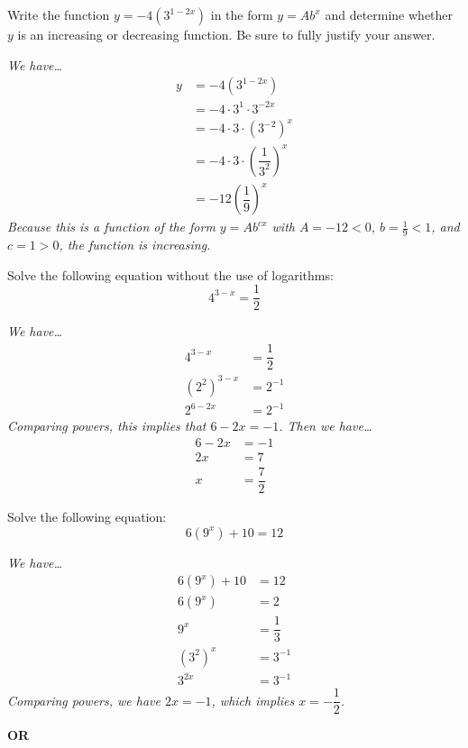 \documentclass[12pt,letterpaper]{exam}
\begin{document}
\begin{questions}
\newpage
\question[6] Write the function $y= -4(3^{1 - 2x})$ in the form $y= Ab^x$ and determine whether $y$ is an increasing or decreasing function. Be sure to fully justify your answer. \pspace

{\itshape We have\dots
	\[
	\begin{aligned}
	y&= -4(3^{1 - 2x}) \\[0.3cm]
	&= -4 \cdot 3^1 \cdot 3^{-2x} \\[0.3cm]
	&= -4 \cdot 3 \cdot (3^{-2})^x \\[0.3cm]
	&= -4 \cdot 3 \cdot \left( \dfrac{1}{3^2} \right)^x \\[0.3cm]
	&= -12 \left( \dfrac{1}{9} \right)^x
	\end{aligned}
	\] \pspace
Because this is a function of the form $y= Ab^{cx}$ with $A= -12 < 0$, $b= \frac{1}{9} < 1$, and $c= 1 > 0$, the function is increasing. 
}



\newpage
\question[6] Solve the following equation without the use of logarithms:
	\[
	4^{3 - x}= \dfrac{1}{2}
	\] \pspace

{\itshape We have\dots
	\[
	\begin{aligned}
	4^{3 - x}&= \dfrac{1}{2} \\[0.3cm]
	(2^2)^{3 - x}&= 2^{-1} \\[0.3cm]
	2^{6 - 2x}&= 2^{-1}
	\end{aligned}
	\]
Comparing powers, this implies that $6 - 2x= -1$. Then we have\dots
	\[
	\begin{aligned}
	6 - 2x&= -1 \\[0.3cm]
	2x&= 7 \\[0.3cm]
	x&= \dfrac{7}{2}
	\end{aligned}
	\]
}



\newpage
\question[6] Solve the following equation:
	\[
	6(9^x) + 10= 12
	\] \pspace

{\itshape We have\dots
	\[
	\begin{aligned}
	6(9^x) + 10&= 12 \\
	6(9^x)&= 2 \\
	9^x&= \dfrac{1}{3} \\
	(3^2)^x&= 3^{-1} \\
	3^{2x}&= 3^{-1}
	\end{aligned}
	\]
Comparing powers, we have $2x= -1$, which implies $x= -\dfrac{1}{2}$.

\begin{center} {\bfseries OR} \end{center}

}
\end{questions}
\end{document}
